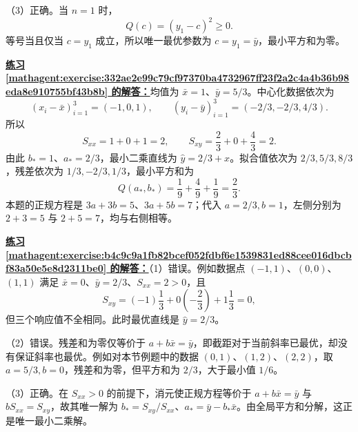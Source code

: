 \documentclass[UTF8,fontset=fandol,11pt]{ctexart}
\begin{document}
（3）正确。当 $n=1$ 时，
\[
Q(c)=(y_1-c)^2\geq0.
\]
等号当且仅当 $c=y_1$ 成立，所以唯一最优参数为 $c=y_1=\bar{y}$，最小平方和为零。\par
\par\noindent\textbf{\hyperref[mathagent:exercise:332ae2e99c79cf97370ba4732967ff23f2a2c4a4b36b98eda8e910755bf43b8b]{练习 \ref*{mathagent:exercise:332ae2e99c79cf97370ba4732967ff23f2a2c4a4b36b98eda8e910755bf43b8b} 的解答：}}均值为 $\bar{x}=1$、$\bar{y}=5/3$。中心化数据依次为
\[
(x_i-\bar{x})_{i=1}^{3}=(-1,0,1),\qquad
(y_i-\bar{y})_{i=1}^{3}=(-2/3,-2/3,4/3).
\]
所以
\[
S_{xx}=1+0+1=2,\qquad S_{xy}=\frac23+0+\frac43=2.
\]
由此 $b_*=1$、$a_*=2/3$，最小二乘直线为 $\hat{y}=2/3+x$。拟合值依次为 $2/3,5/3,8/3$，残差依次为 $1/3,-2/3,1/3$，最小平方和为
\[
Q(a_*,b_*)=\frac19+\frac49+\frac19=\frac23.
\]
本题的正规方程是 $3a+3b=5$、$3a+5b=7$；代入 $a=2/3,b=1$，左侧分别为 $2+3=5$ 与 $2+5=7$，均与右侧相等。\par
\par\noindent\textbf{\hyperref[mathagent:exercise:b4c9c9a1fb82bcef052fdbf6e1539831ed88cee016dbcbf83a50e5e8d2311be0]{练习 \ref*{mathagent:exercise:b4c9c9a1fb82bcef052fdbf6e1539831ed88cee016dbcbf83a50e5e8d2311be0} 的解答：}}（1）错误。例如数据点 $(-1,1)$、$(0,0)$、$(1,1)$ 满足 $\bar{x}=0$、$\bar{y}=2/3$、$S_{xx}=2>0$，且
\[
S_{xy}=(-1)\frac13+0\left(-\frac23\right)+1\frac13=0,
\]
但三个响应值不全相同。此时最优直线是 $\hat{y}=2/3$。

（2）错误。残差和为零仅等价于 $a+b\bar{x}=\bar{y}$，即截距对于当前斜率已最优，却没有保证斜率也最优。例如对本节例题中的数据 $(0,1)$、$(1,2)$、$(2,2)$，取 $a=5/3,b=0$，残差和为零，但平方和为 $2/3$，大于最小值 $1/6$。

（3）正确。在 $S_{xx}>0$ 的前提下，消元使正规方程等价于 $a+b\bar{x}=\bar{y}$ 与 $bS_{xx}=S_{xy}$，故其唯一解为 $b_*=S_{xy}/S_{xx}$、$a_*=\bar{y}-b_*\bar{x}$。由全局平方和分解，这正是唯一最小二乘解。\par
\end{document}
